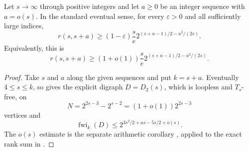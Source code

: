 \begin{theorem}
Let $s\to\infty$ through positive integers and let $a\geq0$ be an integer
sequence with $a=o(s)$.  In the standard eventual sense, for every
$\varepsilon>0$ and all sufficiently large indices,
\[
 r(s,s+a)\geq(1-\varepsilon)\frac{s}{e}
  2^{(s+a-1)/2-a^2/(2s)}.
\]
Equivalently, this is
\[
 r(s,s+a)\geq(1+o(1))\frac{s}{e}
 2^{(s+a-1)/2-a^2/(2s)}.
\]
\end{theorem}
\begin{proof}
Take $s$ and $a$ along the given sequences and put $k=s+a$.  Eventually
$4\leq s\leq k$, so  gives the explicit
digraph $D=D_2(s)$, which is loopless and $T_s$-free, on
\[
N=2^{2s-3}-2^{s-2}=(1+o(1))2^{2s-3}
\]
vertices and
\[
 \operatorname{fwi}_k(D)\leq
 2^{3s^2/2+as-5s/2+o(s)}.
\]
The $o(s)$ estimate is the separate arithmetic corollary
, applied to the exact rank sum in
.


\end{proof}
